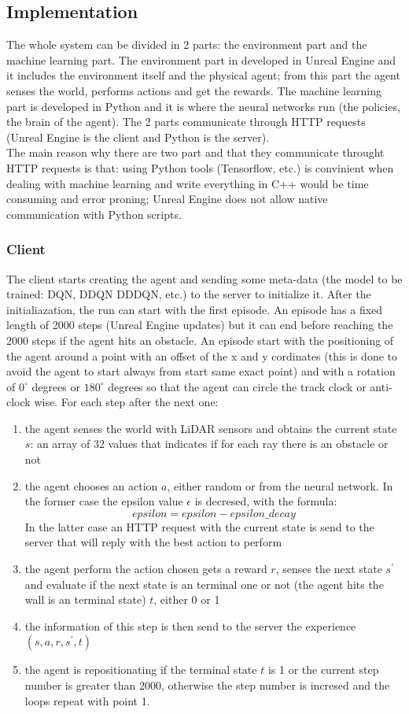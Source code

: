 \documentclass[14pt]{extarticle}
\def\sp{\vspace{5pt}}
\begin{document}
\begin{flushleft}
\subsection{Implementation}
\sp
The whole system can be divided in 2 parts: the environment part and the machine learning part. The environment part in developed in Unreal Engine and it includes the environment itself and the physical agent; from this part the agent senses the world, performs actions and get the rewards. The machine learning part is developed in Python and it is where the neural networks run (the policies, the brain of the agent).
The 2 parts communicate through HTTP requests (Unreal Engine is the client and Python is the server). \\
The main reason why there are two part and that they communicate throught HTTP requests is that: using Python tools (Tensorflow, etc.) is convinient when dealing with machine learning and write everything in C++ would be time consuming and error proning; Unreal Engine does not allow native communication with Python scripts.
\subsubsection{Client}
\sp
The client starts creating the agent and sending some meta-data (the model to be trained: DQN, DDQN DDDQN, etc.) to the server to initialize it. After the initialiazation, the run can start with the first episode. An episode has a fixed length of 2000 steps (Unreal Engine updates) but it can end before reaching the 2000 steps if the agent hits an obstacle. An episode start with the positioning of the agent around a point with an offset of the x and y cordinates (this is done to avoid the agent to start always from start same exact point) and with a rotation of $0^{\circ}$ degrees or $180^{\circ}$ degrees so that the agent can circle the track clock or anti-clock wise. For each step after the next one:
\begin{enumerate}
\item the agent senses the world with LiDAR sensors and obtains the current state $s$: an array of 32 values that indicates if for each ray there is an obstacle or not \label{point1}
\item the agent chooses an action $a$, either random or from the neural network. In the former case the epsilon value $\epsilon$ is decresed, with the formula:
\[epsilon = epsilon - epsilon\_decay\]
In the latter case an HTTP request with the current state is send to the server that will reply with the best action to perform
\item the agent perform the action chosen gets a reward $r$, senses the next state $s^{\prime}$ and evaluate if the next state is an terminal one or not (the agent hits the wall is an terminal state) $t$, either 0 or 1
\item the information of this step is then send to the server the experience $(s,a,r,s^{\prime},t)$
\item the agent is repositionating if the terminal state $t$ is 1 or the current step number is greater than 2000, otherwise the step number is incresed and the loops repeat with point 1.
\end{enumerate}


\end{flushleft}
\end{document}
